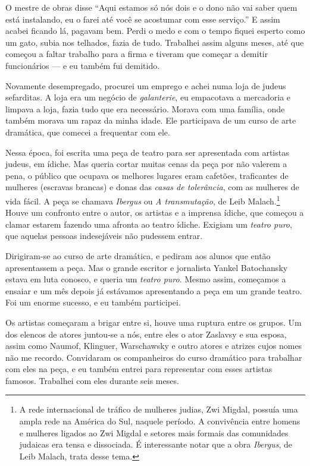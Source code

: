 O mestre de obras disse ``Aqui estamos só nós dois e o dono não vai
saber quem está instalando, eu o farei até você se acostumar com esse
serviço.'' E assim acabei ficando lá, pagavam bem. Perdi o medo e
com o tempo fiquei esperto como um gato, subia nos telhados, fazia de
tudo. Trabalhei assim alguns meses, até que começou a faltar trabalho
para a firma e tiveram que começar a demitir funcionários --- e eu também fui demitido.

Novamente desempregado, procurei um emprego e achei numa loja de judeus
sefarditas. A loja era um negócio de \textit{galanterie}, eu empacotava a
mercadoria e limpava a loja, fazia tudo que era necessário. Morava com
uma família, onde também morava um rapaz da minha idade. Ele
participava de um curso de arte dramática, que comecei a frequentar com ele.

Nessa época, foi escrita uma peça de teatro para ser apresentada 
com artistas judeus, em ídiche. Mas
queria cortar muitas cenas da peça por não valerem a pena, o
público que ocupava os melhores lugares eram cafetões,
traficantes de mulheres (escravas brancas) e donas das \textit{casas de
tolerância}, com as mulheres de vida fácil. A peça se chamava
\textit{Ibergus} ou \textit{A transmutação}, de Leib Malach.\footnote{A rede
  internacional de tráfico de mulheres judias, Zwi Migdal, possuía uma
  ampla rede na América do Sul, naquele período. A convivência entre
  homens e mulheres ligados ao Zwi Migdal e setores mais formais das
  comunidades judaicas era tensa e dissociada. É interessante notar que
  a obra \textit{Ibergus}, de Leib Malach, trata desse tema.} Houve um confronto
entre o autor, os artistas e a imprensa ídiche, que começou a clamar
estarem fazendo uma afronta ao teatro ídiche. Exigiam um \textit{teatro puro}, que aquelas pessoas indesejáveis não pudessem entrar.

Dirigiram-se ao curso de arte dramática, e pediram aos alunos que 
então apresentassem a peça. Mas o grande escritor e jornalista Yankel
Batochansky estava em luta conosco, e queria um \textit{teatro puro}. Mesmo assim, 
começamos a ensaiar e um mês depois já estávamos apresentando a peça
em um grande teatro. Foi um enorme sucesso, e eu também participei.

Os artistas começaram a brigar entre si, houve uma ruptura entre os grupos. Um dos 
elencos de atores juntou-se a nós, entre eles o ator Zaslavsy e sua esposa, assim como Naumof, Klinguer,
Warschawsky e outro atores e atrizes cujos nomes não me recordo.
Convidaram os companheiros do curso dramático para trabalhar com eles na
peça, e eu também entrei para representar com esses artistas famosos. Trabalhei com eles durante seis meses.

